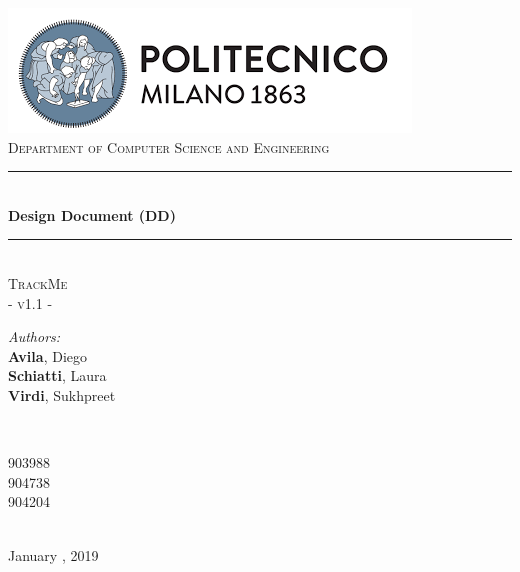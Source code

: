 \documentclass[a4paper, hidelinks, 12pt]{report}
\begin{document}
	\begin{titlepage}
		\centering
		\vspace*{0.7 cm}
		\includegraphics[scale = 0.85]{../Assets/PolimiLogo.png}\\[1.6 cm]
		\textsc{\large Department of Computer Science and Engineering}\\[1.8 cm]
		
		\rule{\linewidth}{0.2 mm} \\[0.4 cm]
		{ \huge \bfseries Design Document (DD)}\\
		\rule{\linewidth}{0.2 mm} \\[1.5 cm]
		
		\textsc{\Large TrackMe}\\[0.5 cm]
		\textsc{\large - v1.1 -}\\[1 cm]
		
		\begin{minipage}{0.4\textwidth}
			\begin{flushleft} \large
				\emph{Authors:}\\
				\textbf{Avila}, Diego \\
				\textbf{Schiatti}, Laura \\
				\textbf{Virdi}, Sukhpreet
			\end{flushleft}
		\end{minipage}~
		\begin{minipage}{0.4\textwidth}
			\begin{flushright} \large
				903988 \\
				904738 \\
				904204
			\end{flushright}
		\end{minipage}\\[2 cm]
		
		{\large January  , 2019}\\[2 cm]
		
		\vfill
	\end{titlepage}
	
	\tableofcontents
	\newpage
	\listoffigures
	\listoftables
	\clearpage
	\setcounter{page}{1}
	
\end{document}
